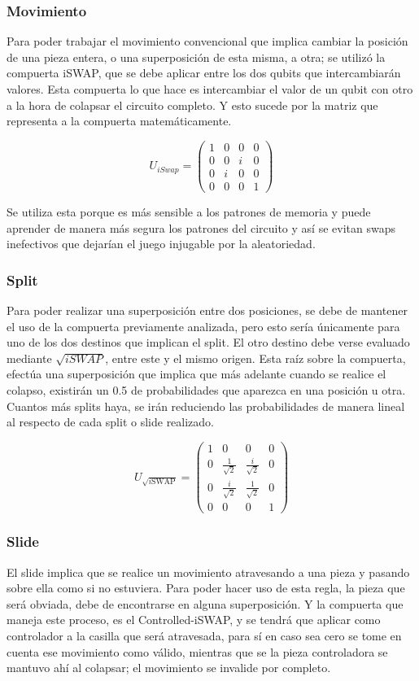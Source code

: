 \subsubsection{Movimiento}
Para poder trabajar el movimiento convencional que implica cambiar la posición de una pieza entera, o una superposición de esta misma, a otra; se utilizó la compuerta iSWAP, que se debe aplicar entre los dos qubits que intercambiarán valores. Esta compuerta lo que hace es intercambiar el valor de un qubit con otro a la hora de colapsar el circuito completo. Y esto sucede por la matriz que representa a la compuerta matemáticamente.

\[
U_{iSwap} = \begin{pmatrix}
	1 & 0 & 0 & 0 \\
	0 & 0 & i & 0 \\
	0 & i & 0 & 0 \\
	0 & 0 & 0 & 1
\end{pmatrix}
\]

Se utiliza esta porque es más sensible a los patrones de memoria y puede aprender de manera más segura los patrones del circuito y así se evitan swaps inefectivos que dejarían el juego injugable por la aleatoriedad.

\subsubsection{Split} 
Para poder realizar una superposición entre dos posiciones, se debe de mantener el uso de la compuerta previamente analizada, pero esto sería únicamente para uno de los dos destinos que implican el split. El otro destino debe verse evaluado mediante $\sqrt{iSWAP}$, entre este y el mismo origen. Esta raíz sobre la compuerta, efectúa una superposición que implica que más adelante cuando se realice el colapso, existirán un 0.5 de probabilidades que aparezca en una posición u otra. Cuantos más splits haya, se irán reduciendo las probabilidades de manera lineal al respecto de cada split o slide realizado.

\[
U_{\sqrt{i\text{SWAP}}} = \begin{pmatrix}
	1 & 0 & 0 & 0 \\
	0 & \frac{1}{\sqrt{2}} & \frac{i}{\sqrt{2}} & 0 \\
	0 & \frac{i}{\sqrt{2}} & \frac{1}{\sqrt{2}} & 0 \\
	0 & 0 & 0 & 1
\end{pmatrix}
\]

\subsubsection{Slide}
El slide implica que se realice un movimiento atravesando a una pieza y pasando sobre ella como si no estuviera. Para poder hacer uso de esta regla, la pieza que será obviada, debe de encontrarse en alguna superposición. Y la compuerta que maneja este proceso, es el Controlled-iSWAP, y se tendrá que aplicar como controlador a la casilla que será atravesada, para sí en caso sea cero se tome en cuenta ese movimiento como válido, mientras que se la pieza controladora se mantuvo ahí al colapsar; el movimiento se invalide por completo.

